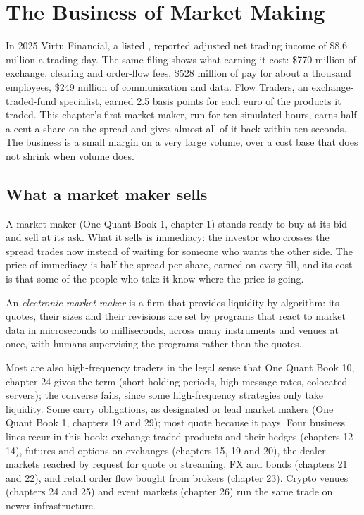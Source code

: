 \chapter{The Business of Market Making}\label{ch:hf:the-business-of-market-making}

In 2025 Virtu Financial, a listed , reported adjusted net trading income of \$8.6 million a trading day. The same filing shows
what earning it cost: \$770 million of exchange, clearing and order-flow fees, \$528 million of pay for about a thousand employees, \$249 million of
communication and data. Flow Traders, an exchange-traded-fund specialist, earned 2.5 basis points for each euro of the products it traded. This
chapter's first market maker, run for ten simulated hours, earns half a cent a share on the spread and gives almost all of it back within ten seconds. The
business is a small margin on a very large volume, over a cost base that does not shrink when volume does.

\section{What a market maker sells}

A market maker (One Quant Book 1, chapter 1) stands ready to buy at its bid and sell at its ask. What it sells is immediacy: the investor who
crosses the spread trades now instead of waiting for someone who wants the other side. The price of immediacy is half the spread per share, earned
on every fill, and its cost is that some of the people who take it know where the price is going.

\begin{definition}\label{def:hf:the-business-of-market-making:emm}
An \emph{electronic market maker} is a firm that provides liquidity by algorithm: its quotes, their sizes and their
revisions are set by programs that react to market data in microseconds to milliseconds, across many instruments and venues at once, with humans
supervising the programs rather than the quotes.
\end{definition}

Most  are also high-frequency traders in the legal sense that One Quant Book 10, chapter 24 gives the term (short holding
periods, high message rates, colocated servers); the converse fails, since some high-frequency strategies only take liquidity. Some  carry obligations, as designated or lead market makers (One Quant Book 1, chapters 19 and 29); most quote because it pays. Four business
lines recur in this book: exchange-traded products and their hedges (chapters 12--14), futures and options on exchanges (chapters 15, 19 and 20), the
dealer markets reached by request for quote or streaming, FX and bonds (chapters 21 and 22), and retail order flow bought from brokers (chapter 23).
Crypto venues (chapters 24 and 25) and event markets (chapter 26) run the same trade on newer infrastructure.

